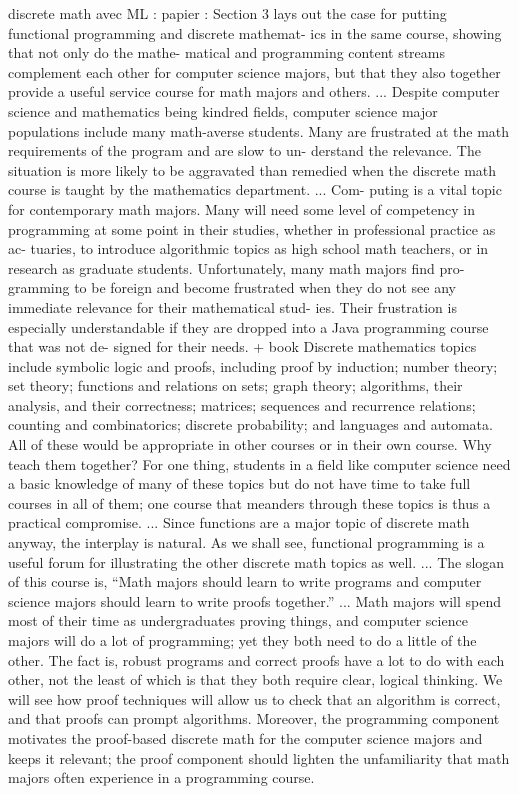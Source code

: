 \documentclass[submission,copyright,creativecommons]{eptcs}
\begin{document}
discrete math avec ML : papier : \cite{DBLP:conf/oopsla/VanDrunen11} 
Section 3 lays out the case for putting functional programming and
discrete mathemat- ics in the same course, showing that not only do
the mathe- matical and programming content streams complement each
other for computer science majors, but that they also together provide
a useful service course for math majors and others. 
...
Despite computer science and mathematics being kindred fields,
computer science major populations include many math-averse
students. Many are frustrated at the math requirements of the program
and are slow to un-
derstand the relevance. The situation is more likely to be aggravated than remedied when the discrete math course is taught by the mathematics department.
...
Com- puting is a vital topic for contemporary math majors. Many will
need some level of competency in programming at some point in their
studies, whether in professional practice as ac- tuaries, to introduce
algorithmic topics as high school math teachers, or in research as
graduate students. 
Unfortunately, many math majors find pro- gramming to be foreign and become frustrated when they do not see any immediate relevance for their mathematical stud- ies. Their frustration is especially understandable if they are dropped into a Java programming course that was not de- signed for their needs.
+
book \cite{bookvandrunen}
Discrete mathematics topics include symbolic logic and proofs, including proof by induction; number theory; set theory; functions and relations on sets; graph theory; algorithms, their analysis, and their correctness; matrices; sequences and recurrence relations; counting and combinatorics; discrete probability; and languages and automata. All of these would be appropriate in other courses or in their own course. Why teach them together? For one thing, students in a field like computer science need a basic knowledge of many of these topics but do not have time to take full courses in all of them; one course that meanders through these topics is thus a practical compromise.
...
Since functions are a major topic of discrete math anyway, the interplay is natural. As we shall see, functional programming is a useful forum for illustrating the other discrete math topics as well.
...
The slogan of this course is, “Math majors should learn to write
programs and computer science majors should learn to write proofs
together.”
...
Math majors will spend most of their time as undergraduates proving
things, and computer science majors will do a lot of programming; yet
they both need to do a little of the other. The fact is,
robust programs and correct proofs have a lot to do with each other,
not the least of which is that they both require clear, logical
thinking. We will see how proof techniques will allow us to check that
an algorithm is correct, and that proofs can prompt
algorithms. Moreover, the programming component motivates the
proof-based discrete math for the computer science majors and keeps it
relevant; the proof component should lighten the unfamiliarity that
math majors often experience in a programming course.
\end{document}
